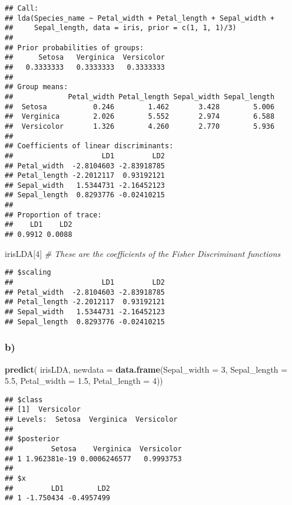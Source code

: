 \documentclass[]{article}
\newenvironment{Shaded}{\begin{snugshade}}{\end{snugshade}}
\newcommand{\CommentTok}[1]{\textcolor[rgb]{0.56,0.35,0.01}{\textit{#1}}}
\newcommand{\DataTypeTok}[1]{\textcolor[rgb]{0.13,0.29,0.53}{#1}}
\newcommand{\DecValTok}[1]{\textcolor[rgb]{0.00,0.00,0.81}{#1}}
\newcommand{\FloatTok}[1]{\textcolor[rgb]{0.00,0.00,0.81}{#1}}
\newcommand{\KeywordTok}[1]{\textcolor[rgb]{0.13,0.29,0.53}{\textbf{#1}}}
\newcommand{\NormalTok}[1]{#1}
\begin{document}
\begin{verbatim}
## Call:
## lda(Species_name ~ Petal_width + Petal_length + Sepal_width + 
##     Sepal_length, data = iris, prior = c(1, 1, 1)/3)
## 
## Prior probabilities of groups:
##      Setosa   Verginica  Versicolor 
##   0.3333333   0.3333333   0.3333333 
## 
## Group means:
##             Petal_width Petal_length Sepal_width Sepal_length
##  Setosa           0.246        1.462       3.428        5.006
##  Verginica        2.026        5.552       2.974        6.588
##  Versicolor       1.326        4.260       2.770        5.936
## 
## Coefficients of linear discriminants:
##                     LD1         LD2
## Petal_width  -2.8104603 -2.83918785
## Petal_length -2.2012117  0.93192121
## Sepal_width   1.5344731 -2.16452123
## Sepal_length  0.8293776 -0.02410215
## 
## Proportion of trace:
##    LD1    LD2 
## 0.9912 0.0088
\end{verbatim}

\begin{Shaded}
\begin{Highlighting}[]
\NormalTok{irisLDA[}\DecValTok{4}\NormalTok{] }\CommentTok{# These are the coefficients of the Fisher Discriminant functions}
\end{Highlighting}
\end{Shaded}

\begin{verbatim}
## $scaling
##                     LD1         LD2
## Petal_width  -2.8104603 -2.83918785
## Petal_length -2.2012117  0.93192121
## Sepal_width   1.5344731 -2.16452123
## Sepal_length  0.8293776 -0.02410215
\end{verbatim}

\hypertarget{b}{%
\subsubsection{b)}\label{b}}

\begin{Shaded}
\begin{Highlighting}[]
\KeywordTok{predict}\NormalTok{( irisLDA, }\DataTypeTok{newdata =} \KeywordTok{data.frame}\NormalTok{(}\DataTypeTok{Sepal_width =} \DecValTok{3}\NormalTok{, }\DataTypeTok{Sepal_length =} \FloatTok{5.5}\NormalTok{, }\DataTypeTok{Petal_width =} \FloatTok{1.5}\NormalTok{, }\DataTypeTok{Petal_length =} \DecValTok{4}\NormalTok{))}
\end{Highlighting}
\end{Shaded}

\begin{verbatim}
## $class
## [1]  Versicolor
## Levels:  Setosa  Verginica  Versicolor
## 
## $posterior
##         Setosa    Verginica  Versicolor
## 1 1.962381e-19 0.0006246577   0.9993753
## 
## $x
##         LD1        LD2
## 1 -1.750434 -0.4957499
\end{verbatim}
\end{document}
